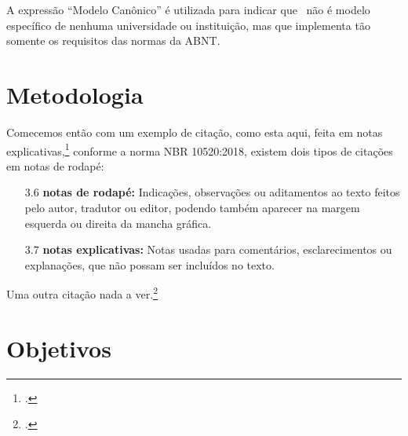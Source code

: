 \documentclass[
	12pt,				%
	openright,			%
	twoside,			%
	a4paper,			%
	english,			%
	brazil				%
	]{abntex2}
\newcommand{\caixabranca}{\fbox}
\newcommand{\caixa}[1]{\caixabranca{\small{\begin{minipage}{\textwidth-2.5cm}{#1}\end{minipage}}}}
\begin{document}
A expressão ``Modelo Canônico'' é utilizada para indicar que \abnTeX\ não é modelo específico de nenhuma universidade ou instituição, mas que implementa tão somente os requisitos das normas da ABNT.

\section{Metodologia}
Comecemos então com um exemplo de citação, como esta aqui, feita em notas explicativas,\footcite[Esta é uma nota explicativa. Cf. e.g.,][\S 12]{boyle1772} conforme a norma NBR 10520:2018, existem dois tipos de citações em notas de rodapé:
\begin{citacao}
	\begin{itemize}
		\item[$3.6$] \textbf{notas de rodapé:} Indicações, observações ou aditamentos ao texto feitos pelo autor, tradutor ou editor, podendo	também aparecer na margem esquerda ou direita da mancha gráfica.
		\item[$3.7$] \textbf{notas explicativas:} Notas usadas para comentários, esclarecimentos ou explanações, que não possam ser incluídos no texto.
	\end{itemize}
\end{citacao}


Uma outra citação nada a ver.\footcite[Esta é uma outra nota explicativa. Ver também ][p.~12]{herao}


\lipsum[1]

\section{Objetivos}

\lipsum[7]
\end{document}
